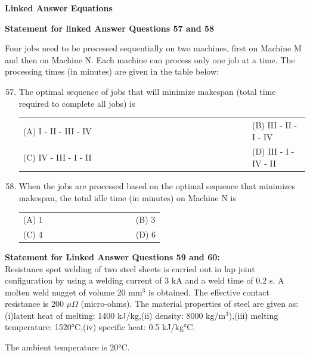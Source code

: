 \documentclass[a4paper,12pt]{article}
\begin{document}
\textbf{\large{Linked Answer Equations}}

\textbf{Statement for linked Answer Questions 57 and 58}

 Four jobs need to be processed sequentially on two machines, first on Machine M and then on Machine N. Each machine can process only one job at a time. The processing times (in minutes) are given in the table below:

\begin{enumerate}[label=Q.\arabic*, leftmargin=*]
\setcounter{enumi}{56}
\item The optimal sequence of jobs that will minimize makespan (total time required to complete all jobs) is
\begin{multicols}{2}
\begin{tabular}[t]{p{0.8\linewidth} p{0.9\linewidth}}
(A) I - II - III - IV & (B) III - II - I - IV \\
(C) IV - III - I - II & (D) III - I - IV - II \\
\end{tabular}
\end{multicols}

\item When the jobs are processed based on the optimal sequence that minimizes makespan, the total idle time (in minutes) on Machine N is
\begin{multicols}{2}
\begin{tabular}[t]{p{0.8\linewidth} p{0.9\linewidth}}
(A) 1 & (B) 3 \\
(C) 4 & (D) 6 \\
\end{tabular}
\end{multicols}
\end{enumerate}


\vspace{1em}

\textbf{Statement for Linked Answer Questions 59 and 60:} \\
Resistance spot welding of two steel sheets is carried out in lap joint configuration by using a welding current of 3 kA and a weld time of 0.2 s. A molten weld nugget of volume 20 mm$^3$ is obtained. The effective contact resistance is 200 $\mu\Omega$ (micro-ohms). The material properties of steel are given as: (i)latent heat of melting: 1400 kJ/kg,(ii) density: 8000 kg/m$^3$),(iii) melting temperature: 1520°C,(iv) specific heat: 0.5 kJ/kg°C.

The ambient temperature is 20°C.
\end{document}
